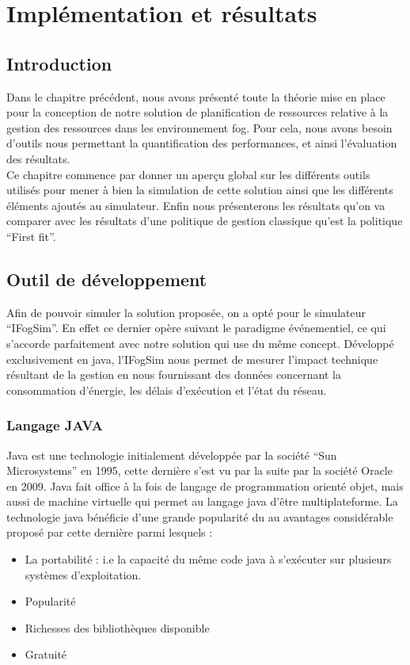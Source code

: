 \chapter{Implémentation et résultats}
\section{Introduction}
Dans le chapitre précédent, nous avons présenté toute la théorie mise en place pour la conception de notre solution de planification de ressources relative à la gestion des ressources dans les environnement fog. Pour cela, nous avons besoin d'outils nous permettant la quantification des performances, et ainsi l’évaluation des résultats. \\
Ce chapitre commence par donner un aperçu global sur les différents outils utilisés pour mener à bien la simulation de cette solution ainsi que les différents éléments ajoutés au simulateur. Enfin nous présenterons les résultats qu’on va comparer avec les résultats d’une politique de gestion classique qu'est la politique “First fit”.\\
\section{Outil de développement}
Afin de pouvoir simuler la solution proposée, on a opté pour le simulateur “IFogSim”. En effet ce dernier opère suivant le paradigme événementiel, ce qui s’accorde parfaitement avec notre solution qui use du même concept. Développé exclusivement en java, l’IFogSim nous permet de mesurer l'impact technique résultant de la gestion en nous fournissant des données concernant la consommation d'énergie, les délais d'exécution et l’état du réseau.
\subsection{Langage JAVA}
Java est une technologie initialement développée par la société “Sun Microsystems” en 1995, cette dernière s'est vu par la suite par la société Oracle en 2009. Java fait office à la fois de langage de programmation orienté objet, mais aussi de machine virtuelle qui permet au langage java d'être multiplateforme. La technologie java bénéficie d’une grande popularité du au avantages considérable proposé par cette dernière parmi lesquels :
\begin{itemize}
    \item La portabilité : i.e la capacité du même code java à s'exécuter sur plusieurs systèmes d’exploitation.
    \item Popularité
    \item Richesses des bibliothèques disponible
    \item Gratuité 
\end{itemize}
